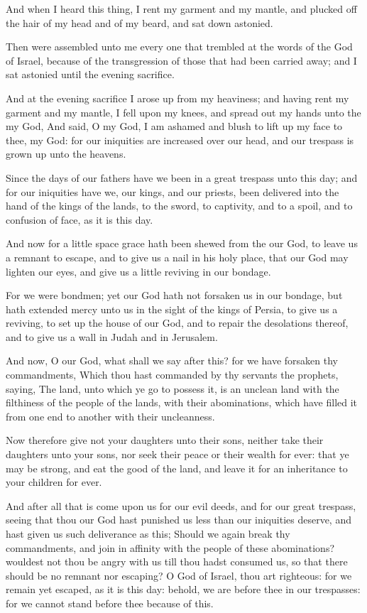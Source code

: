 \verse And when I heard this thing, I rent my garment and my mantle, and plucked off the hair of my head and of my beard, and sat down astonied.

\verse Then were assembled unto me every one that trembled at the words of the God of Israel, because of the transgression of those that had been carried away; and I sat astonied until the evening sacrifice.

\verse And at the evening sacrifice I arose up from my heaviness; and having rent my garment and my mantle, I fell upon my knees, and spread out my hands unto the \LORD my God, \verse And said, O my God, I am ashamed and blush to lift up my face to thee, my God: for our iniquities are increased over our head, and our trespass is grown up unto the heavens.

\verse Since the days of our fathers have we been in a great trespass unto this day; and for our iniquities have we, our kings, and our priests, been delivered into the hand of the kings of the lands, to the sword, to captivity, and to a spoil, and to confusion of face, as it is this day.

\verse And now for a little space grace hath been shewed from the \LORD our God, to leave us a remnant to escape, and to give us a nail in his holy place, that our God may lighten our eyes, and give us a little reviving in our bondage.

\verse For we were bondmen; yet our God hath not forsaken us in our bondage, but hath extended mercy unto us in the sight of the kings of Persia, to give us a reviving, to set up the house of our God, and to repair the desolations thereof, and to give us a wall in Judah and in Jerusalem.

\verse And now, O our God, what shall we say after this? for we have forsaken thy commandments, \verse Which thou hast commanded by thy servants the prophets, saying, The land, unto which ye go to possess it, is an unclean land with the filthiness of the people of the lands, with their abominations, which have filled it from one end to another with their uncleanness.

\verse Now therefore give not your daughters unto their sons, neither take their daughters unto your sons, nor seek their peace or their wealth for ever: that ye may be strong, and eat the good of the land, and leave it for an inheritance to your children for ever.

\verse And after all that is come upon us for our evil deeds, and for our great trespass, seeing that thou our God hast punished us less than our iniquities deserve, and hast given us such deliverance as this; \verse Should we again break thy commandments, and join in affinity with the people of these abominations? wouldest not thou be angry with us till thou hadst consumed us, so that there should be no remnant nor escaping?  \verse O \LORD God of Israel, thou art righteous: for we remain yet escaped, as it is this day: behold, we are before thee in our trespasses: for we cannot stand before thee because of this.


